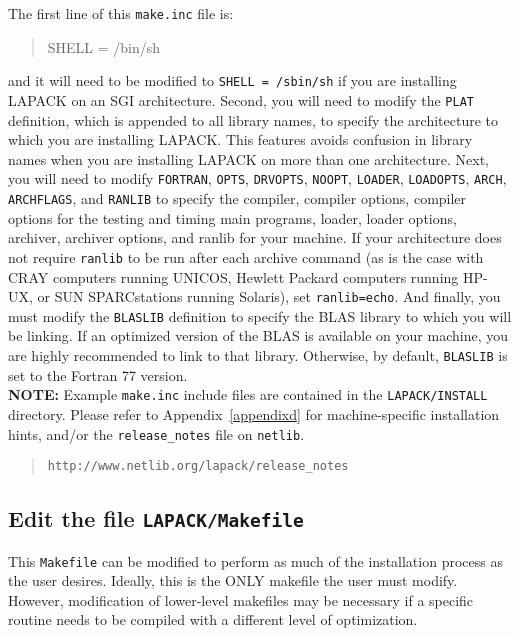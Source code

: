 The first line of this {\tt make.inc} file is:
\begin{quote}
SHELL = /bin/sh
\end{quote}
and it will need to be modified to {\tt SHELL = /sbin/sh} if you are
installing LAPACK on an SGI architecture.
Second, you will
need to modify the {\tt PLAT} definition, which is appended to all
library names, to specify the architecture to which you are installing
LAPACK.  This features avoids confusion in library names when you are
installing LAPACK on more than one architecture.  Next, you will need
to modify {\tt FORTRAN}, {\tt OPTS}, {\tt DRVOPTS}, {\tt NOOPT}, {\tt LOADER},
{\tt LOADOPTS}, {\tt ARCH}, {\tt ARCHFLAGS}, and {\tt RANLIB} to specify
the compiler, compiler options, compiler options for the testing and
timing main programs, loader, loader options, archiver,
archiver options, and ranlib for your machine.  If your architecture
does not require {\tt ranlib} to be run after each archive command (as
is the case with CRAY computers running UNICOS, Hewlett Packard
computers running HP-UX, or SUN SPARCstations running Solaris), set
{\tt ranlib=echo}.  And finally, you must
modify the {\tt BLASLIB} definition to specify the BLAS library to which
you will be linking.  If an optimized version of the BLAS is available
on your machine, you are highly recommended to link to that library.
Otherwise, by default, {\tt BLASLIB} is set to the Fortran 77 version.  \\

{\bf NOTE:}  Example {\tt make.inc} include files are contained in the
{\tt LAPACK/INSTALL} directory.  Please refer to
Appendix~\ref{appendixd} for machine-specific installation hints, and/or
the {\tt release\_notes} file on {\tt netlib}.
\begin{quote}
{\tt http://www.netlib.org/lapack/release\_notes}
\end{quote}

\subsection{Edit the file {\tt LAPACK/Makefile}}\label{toplevelmakefile}

\dent
This {\tt Makefile} can be modified to perform as much of the
installation process as the user desires.  Ideally, this is the ONLY
makefile the user must modify.  However, modification of lower-level
makefiles may be necessary if a specific routine needs to be compiled
with a different level of optimization.  

